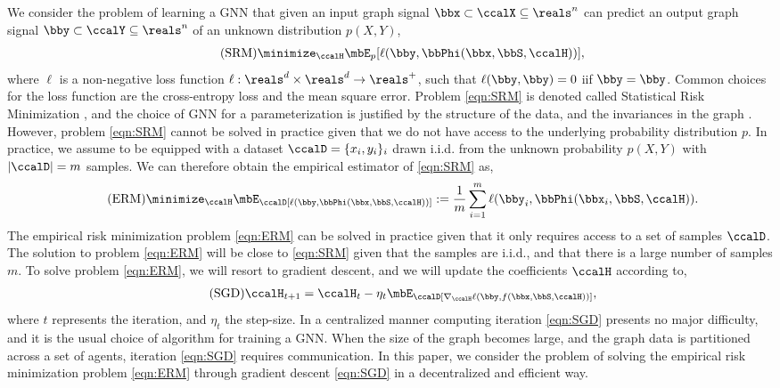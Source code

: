 \documentclass[lettersize,journal]{IEEEtran}
\begin{document}
We consider the problem of learning a GNN that given an input graph signal $\bbx\subset\ccalX\subseteq\reals^n$ can predict an output graph signal $\bby\subset\ccalY\subseteq\reals^n$ of an unknown distribution $p(X,Y)$, 
%
\begin{align}\label{eqn:SRM}
	\tag{SRM}
	\minimize_\ccalH \mbE_{p}[ \ell(\bby,\bbPhi(\bbx,\bbS,\ccalH))],
\end{align}
% 
where $\ell$ is a non-negative loss function $\ell:\reals^d\times\reals^d\to\reals^+$, such that $\ell(\bby, \bby)=0$ iif $\bby=\bby$. Common choices for the loss function are the cross-entropy loss and the mean square error.
Problem \eqref{eqn:SRM} is denoted called Statistical Risk Minimization \cite{vapnik2013nature}, and the choice of GNN for a parameterization is justified by the structure of the data, and the invariances in the graph \cite{bronstein2017geometric}. However, problem \eqref{eqn:SRM} cannot be solved in practice given that we do not have access to the underlying probability distribution $p$. In practice, we assume to be equipped with a dataset $\ccalD=\{x_i,y_i\}_i$ drawn i.i.d. from the unknown probability $p(X,Y)$ with $|\ccalD|=m$ samples. We can therefore obtain the empirical estimator of \eqref{eqn:SRM} as, 
%
\begin{align}\label{eqn:ERM}
	\tag{ERM}
	\minimize_\ccalH \mbE_\ccalD[ \ell(\bby,\bbPhi(\bbx,\bbS,\ccalH))]:=\frac{1}{m}\sum_{i=1}^m \ell(\bby_i,\bbPhi(\bbx_i,\bbS,\ccalH)).
\end{align}
The empirical risk minimization problem \eqref{eqn:ERM} can be solved in practice given that it only requires access to a set of samples $\ccalD$. 
The solution to problem \eqref{eqn:ERM} will be close to \eqref{eqn:SRM} given that the samples are i.i.d., and that there is a large number of samples $m$\cite{vapnik2013nature}. To solve problem \eqref{eqn:ERM}, we will resort to gradient descent, and we will update the coefficients $\ccalH$ according to, 
%
\begin{align}\label{eqn:SGD}
	\tag{SGD}
	\ccalH_{t+1} = \ccalH_{t} -\eta_t \mbE_\ccalD[\nabla_\ccalH \ell(\bby, f(\bbx,\bbS, \ccalH))],
\end{align}
%
where $t$ represents the iteration, and $\eta_t$ the step-size. In a centralized manner computing iteration \eqref{eqn:SGD} presents no major difficulty, and it is the usual choice of algorithm for training a GNN. When the size of the graph becomes large, and the graph data is partitioned across a set of agents, iteration \eqref{eqn:SGD} requires communication. 
In this paper, we consider the problem of solving the empirical risk minimization problem \eqref{eqn:ERM} through gradient descent \eqref{eqn:SGD} in a decentralized and efficient way.
\end{document}
